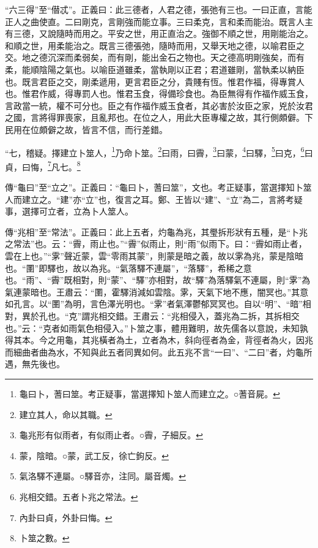 {\noindent\shu{}\fzkt “六三得”至“僣忒”。正義曰：此三德者，人君之德，張弛有三也。一曰正直，言能正人之曲使直。二曰剛克，言剛強而能立事。三曰柔克，言和柔而能治。既言人主有三德，又說隨時而用之。平安之世，用正直治之。強御不順之世，用剛能治之。和順之世，用柔能治之。既言三德張弛，隨時而用，又舉天地之德，以喻君臣之交。地之德沉深而柔弱矣，而有剛，能出金石之物也。天之德高明剛強矣，而有柔，能順陰陽之氣也。以喻臣道雖柔，當執剛以正君；君道雖剛，當執柔以納臣也。既言君臣之交，剛柔遞用，更言君臣之分，貴賤有恆。惟君作福，得專賞人也。惟君作威，得專罰人也。惟君玉食，得備珍食也。為臣無得有作福作威玉食，言政當一統，權不可分也。臣之有作福作威玉食者，其必害於汝臣之家，兇於汝君之國，言將得罪喪家，且亂邦也。在位之人，用此大臣專權之故，其行側頗僻。下民用在位頗僻之故，皆言不信，而行差錯。 \par}

“七，稽疑。擇建立卜筮人，\footnote{龜曰卜，蓍曰筮。考正疑事，當選擇知卜筮人而建立之。○蓍音屍。}乃命卜筮。\footnote{建立其人，命以其職。}曰雨，曰霽，\footnote{龜兆形有似雨者，有似雨止者。○霽，子細反。}曰蒙，\footnote{蒙，陰暗。○蒙，武工反，徐亡鉤反。}曰驛，\footnote{氣洛驛不連屬。○驛音亦，注同。屬音燭。}曰克，\footnote{兆相交錯。五者卜兆之常法。}曰貞，曰悔，\footnote{內卦曰貞，外卦曰悔。}凡七。\footnote{卜筮之數。}


{\noindent\zhuan{}\fzbyks 傳“龜曰”至“立之”。正義曰：“龜曰卜，蓍曰筮”，文也。考正疑事，當選擇知卜筮人而建立之。“建”亦“立”也，復言之耳。鄭、王皆以“建”、“立”為二，言將考疑事，選擇可立者，立為卜人筮人。 \par}

{\noindent\zhuan{}\fzbyks 傳“兆相”至“常法”。正義曰：此上五者，灼龜為兆，其璺拆形狀有五種，是“卜兆之常法”也。云：“霽，雨止也。”“霽”似雨止，則“雨”似雨下。曰：“霽如雨止者，雲在上也。”“雺”聲近蒙，雲“零雨其蒙”，則蒙是暗之義，故以雺為兆，蒙是陰暗也。“圛”即驛也，故以為兆。“氣落驛不連屬”，“落驛”，希稀之意也。“雨”、“霽”既相對，則“蒙”、“驛”亦相對，故“驛”為落驛氣不連屬，則“雺”為氣連蒙暗也。王肅云：“圛，霍驛消減如雲陰。雺，天氣下地不應，闇冥也。”其意如孔言。以“圛”為明，言色澤光明也。“雺”者氣澤鬱郁冥冥也。自以“明”、“暗”相對，異於孔也。“克”謂兆相交錯。王肅云：“兆相侵入，蓋兆為二拆，其拆相交也。”云：“克者如雨氣色相侵入。”卜筮之事，體用難明，故先儒各以意說，未知孰得其本。今之用龜，其兆橫者為土，立者為木，斜向徑者為金，背徑者為火，因兆而細曲者曲為水，不知與此五者同異如何。此五兆不言“一曰”、“二曰”者，灼龜所遇，無先後也。 \par}

